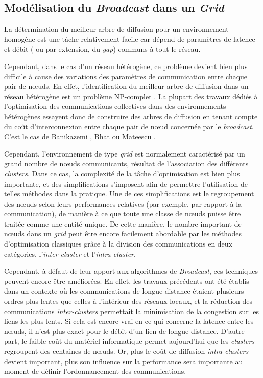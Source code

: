 \subsection{Modélisation du \textit{Broadcast} dans un \textit{Grid}}

La détermination du meilleur arbre de diffusion pour un environnement
homogène est une tâche relativement facile car dépend de paramètres de latence et débit ( ou par extension, du \textit{gap}) communs à tout le réseau.  

Cependant, dans le cas d'un réseau hétérogène, ce problème devient
bien plus difficile à cause des variations des paramètres de communication entre chaque pair de n{\oe}uds. En effet, l'identification du meilleur arbre
de diffusion dans un réseau hétérogène est un problème NP-complet \cite{Bhat99}\cite{Beaumont04c,Beaumont05b}\cite{PangfengLiu04}.
La plupart des travaux dédiés à l'optimisation des communications
collectives dans des environnements hétérogènes essayent donc de construire des arbres de diffusion en tenant compte du coût d'interconnexion entre chaque pair de n{\oe}ud concernée par le \textit{broadcast}. C'est le cas de Banikazemi \cite{Banikazemi98},
Bhat \cite{Bhat99,Bhat03} ou Mateescu \cite{Mateescu05}.

Cependant, l'environnement de type \textit{grid} est normalement caractérisé
par un grand nombre de n{\oe}uds communicants, résultat de l'association
des différents \textit{clusters}. Dans ce cas, la complexité de la
tâche d'optimisation est bien plus importante, et des simplifications
s'imposent afin de permettre l'utilisation de telles méthodes dans
la pratique. Une de ces simplifications est le regroupement des n{\oe}uds
selon leurs performances relatives (par exemple, par rapport à la
communication), de manière à ce que toute une classe de n{\oe}uds
puisse être traitée comme une entité unique. De cette manière, le nombre important de n{\oe}uds dans un \textit{grid} peut être
encore facilement abordable par les méthodes d'optimisation classiques grâce à la division des communications en deux catégories, l'\textit{inter-cluster} et l'\textit{intra-cluster}. 


Cependant, à défaut de leur apport aux algorithmes de \textit{Broadcast}, ces
techniques peuvent encore être améliorées. En effet, les travaux précédents
ont été établis dans un contexte où les communications de longue distance
étaient plusieurs ordres plus lentes que celles à l'intérieur des
réseaux locaux, et la réduction des communications \textit{inter-clusters} permettait
la minimisation de la congestion sur les liens les plus lents. Si
cela est encore vrai en ce qui concerne la latence entre les n{\oe}uds,
il n'est plus exact pour le débit d'un lien de longue distance. D'autre
part, le faible coût du matériel informatique permet aujourd'hui que
les  \textit{clusters} regroupent des centaines de n{\oe}uds. Or, plus le coût de
diffusion \textit{intra-clusters} devient important, plus son influence
sur la performance sera importante au moment de définir l'ordonnancement
des communications.

